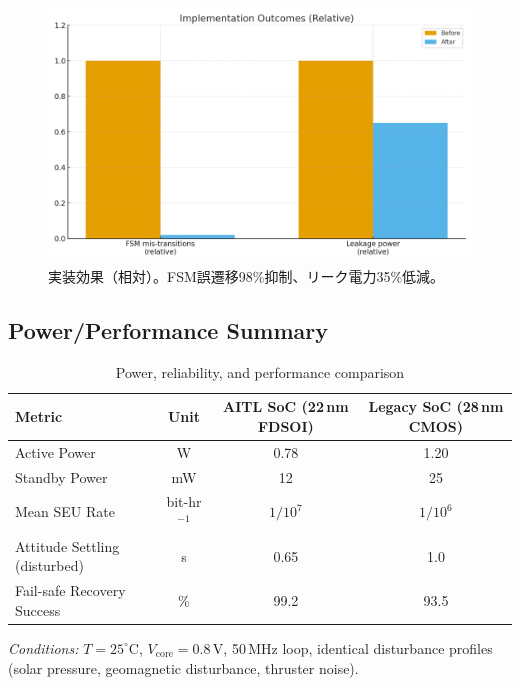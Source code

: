 \documentclass[conference]{IEEEtran}
\begin{document}
\begin{figure}[t]
  \centering
  \includegraphics[width=\linewidth]{figs/fig_impl_outcomes.png}
  \caption{実装効果（相対）。FSM誤遷移98\%抑制、リーク電力35\%低減。}
  \label{fig:impl}
\end{figure}
\FloatBarrier

\subsection{Power/Performance Summary}
\begin{table}[t]
\centering
\caption{Power, reliability, and performance comparison}
\label{tab:power}
\setlength{\tabcolsep}{10pt} %
\renewcommand{\arraystretch}{1.2} %
\begin{tabular}{lccc}
\toprule
Metric & Unit & AITL SoC (22\,nm FDSOI) & Legacy SoC (28\,nm CMOS)\\
\midrule
Active Power            & W     & 0.78  & 1.20  \\
Standby Power           & mW    & 12    & 25    \\
Mean SEU Rate           & bit-hr$^{-1}$ & $1/10^7$ & $1/10^6$ \\
Attitude Settling (disturbed) & s & 0.65  & 1.0   \\
Fail-safe Recovery Success    & \% & 99.2 & 93.5  \\
\bottomrule
\end{tabular}
\vspace{2pt}
\footnotesize \emph{Conditions:} $T=25^\circ$C, $V_{\mathrm{core}}=0.8$\,V, 50\,MHz loop, identical disturbance profiles (solar pressure, geomagnetic disturbance, thruster noise).
\end{table}
\end{document}
